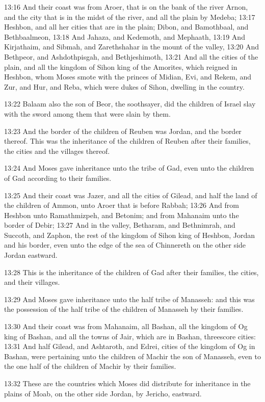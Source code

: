 13:16 And their coast was from Aroer, that is on the bank of the river Arnon, and the city that is in the midst of the river, and all the plain by Medeba; 13:17 Heshbon, and all her cities that are in the plain; Dibon, and Bamothbaal, and Bethbaalmeon, 13:18 And Jahaza, and Kedemoth, and Mephaath, 13:19 And Kirjathaim, and Sibmah, and Zarethshahar in the mount of the valley, 13:20 And Bethpeor, and Ashdothpisgah, and Bethjeshimoth, 13:21 And all the cities of the plain, and all the kingdom of Sihon king of the Amorites, which reigned in Heshbon, whom Moses smote with the princes of Midian, Evi, and Rekem, and Zur, and Hur, and Reba, which were dukes of Sihon, dwelling in the country.

13:22 Balaam also the son of Beor, the soothsayer, did the children of Israel slay with the sword among them that were slain by them.

13:23 And the border of the children of Reuben was Jordan, and the border thereof. This was the inheritance of the children of Reuben after their families, the cities and the villages thereof.

13:24 And Moses gave inheritance unto the tribe of Gad, even unto the children of Gad according to their families.

13:25 And their coast was Jazer, and all the cities of Gilead, and half the land of the children of Ammon, unto Aroer that is before Rabbah; 13:26 And from Heshbon unto Ramathmizpeh, and Betonim; and from Mahanaim unto the border of Debir; 13:27 And in the valley, Betharam, and Bethnimrah, and Succoth, and Zaphon, the rest of the kingdom of Sihon king of Heshbon, Jordan and his border, even unto the edge of the sea of Chinnereth on the other side Jordan eastward.

13:28 This is the inheritance of the children of Gad after their families, the cities, and their villages.

13:29 And Moses gave inheritance unto the half tribe of Manasseh: and this was the possession of the half tribe of the children of Manasseh by their families.

13:30 And their coast was from Mahanaim, all Bashan, all the kingdom of Og king of Bashan, and all the towns of Jair, which are in Bashan, threescore cities: 13:31 And half Gilead, and Ashtaroth, and Edrei, cities of the kingdom of Og in Bashan, were pertaining unto the children of Machir the son of Manasseh, even to the one half of the children of Machir by their families.

13:32 These are the countries which Moses did distribute for inheritance in the plains of Moab, on the other side Jordan, by Jericho, eastward.

